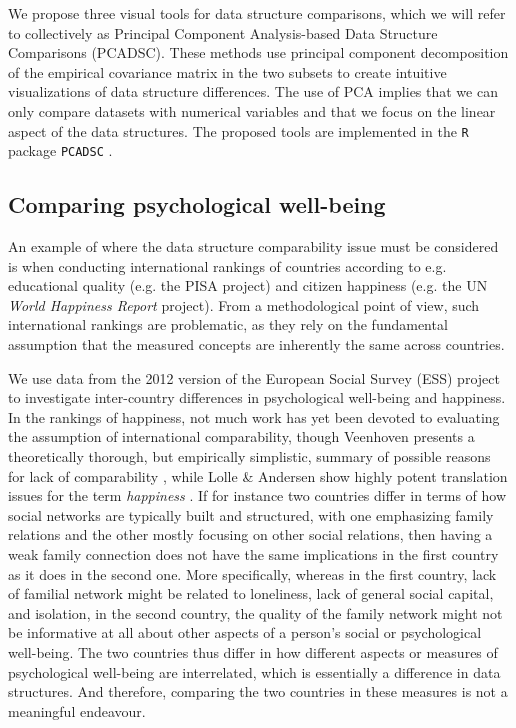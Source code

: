 \documentclass[]{interact}
\theoremstyle{plain}%
\theoremstyle{definition}
\theoremstyle{remark}
\begin{document}
We propose three visual tools for data structure comparisons, which we will refer to collectively as Principal Component Analysis-based Data Structure Comparisons (PCADSC). These methods use principal component decomposition of the empirical covariance matrix in the two subsets to create intuitive visualizations of data structure differences. The use of PCA implies that we can only compare datasets with numerical variables and that we focus on the linear aspect of the  data structures. The proposed tools are implemented in the \texttt{R} package \texttt{PCADSC} \cite{PCADSC}. %

\subsection{Comparing psychological well-being}
An example of where the data structure comparability issue must be considered is when conducting international rankings of countries according to e.g. educational quality (e.g. the PISA project) and citizen happiness (e.g. the UN \textit{World Happiness Report} project). From a methodological point of view, such international rankings are problematic, as they rely on the fundamental assumption that the measured concepts are inherently the same across countries. 

We use data from the 2012 version of the European Social Survey (ESS) project to investigate inter-country differences in psychological well-being and happiness.
In the rankings of happiness, not much work has yet been devoted to evaluating the assumption of international comparability, though Veenhoven presents a theoretically thorough, but empirically simplistic, summary of possible reasons for lack of comparability \cite{Veenhoven2012}, while Lolle \& Andersen show highly potent translation issues for the term \textit{happiness} \cite{Lolle2016}. If for instance two countries differ in terms of how social networks are typically built and structured, with one emphasizing family relations and the other mostly focusing on other social relations, then having a weak family connection does not have the same implications in the first country as it does in the second one. More specifically, whereas in the first country, lack of familial network might be related to loneliness, lack of general social capital, and isolation, in the second country, the quality of the family network might not be informative at all about other aspects of a person's social or psychological well-being. The two countries thus differ in how different aspects or measures of psychological well-being are interrelated, which is essentially a difference in data structures. And therefore, comparing the two countries in these measures is not a meaningful endeavour. 
\end{document}
